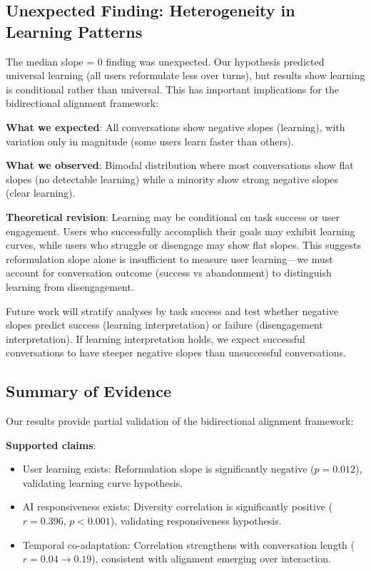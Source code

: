 \subsection{Unexpected Finding: Heterogeneity in Learning Patterns}

The median slope = 0 finding was unexpected. Our hypothesis predicted universal learning (all users reformulate less over turns), but results show learning is conditional rather than universal. This has important implications for the bidirectional alignment framework:

\textbf{What we expected}: All conversations show negative slopes (learning), with variation only in magnitude (some users learn faster than others).

\textbf{What we observed}: Bimodal distribution where most conversations show flat slopes (no detectable learning) while a minority show strong negative slopes (clear learning).

\textbf{Theoretical revision}: Learning may be conditional on task success or user engagement. Users who successfully accomplish their goals may exhibit learning curves, while users who struggle or disengage may show flat slopes. This suggests reformulation slope alone is insufficient to measure user learning---we must account for conversation outcome (success vs abandonment) to distinguish learning from disengagement.

Future work will stratify analyses by task success and test whether negative slopes predict success (learning interpretation) or failure (disengagement interpretation). If learning interpretation holds, we expect successful conversations to have steeper negative slopes than unsuccessful conversations.

\subsection{Summary of Evidence}

Our results provide partial validation of the bidirectional alignment framework:

\textbf{Supported claims}:
\begin{itemize}
\item[$\checkmark$] User learning exists: Reformulation slope is significantly negative ($p=0.012$), validating learning curve hypothesis.
\item[$\checkmark$] AI responsiveness exists: Diversity correlation is significantly positive ($r=0.396$, $p<0.001$), validating responsiveness hypothesis.
\item[$\checkmark$] Temporal co-adaptation: Correlation strengthens with conversation length ($r=0.04 \rightarrow 0.19$), consistent with alignment emerging over interaction.
\end{itemize}

